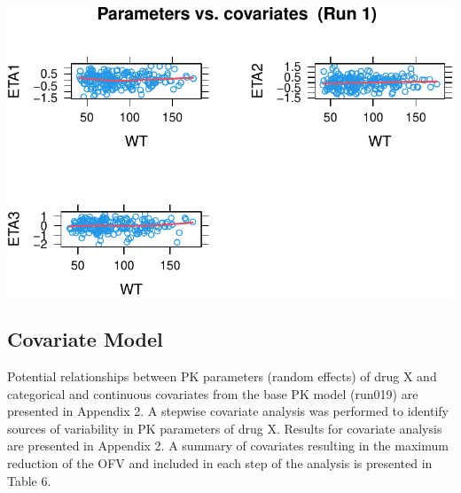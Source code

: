 \documentclass[
  letterpaper,
  toc=chapterentrywithdots,
  11pt,
  headings=small]{scrreprt}
\begin{document}
\includegraphics{sec/results_files/figure-pdf/unnamed-chunk-2-6.pdf}

\subsection{Covariate Model}\label{covariate-model}

Potential relationships between PK parameters (random effects) of drug X
and categorical and continuous covariates from the base PK model
(run019) are presented in Appendix 2. A stepwise covariate analysis was
performed to identify sources of variability in PK parameters of drug X.
Results for covariate analysis are presented in Appendix 2. A summary of
covariates resulting in the maximum reduction of the OFV and included in
each step of the analysis is presented in Table 6.
\end{document}
